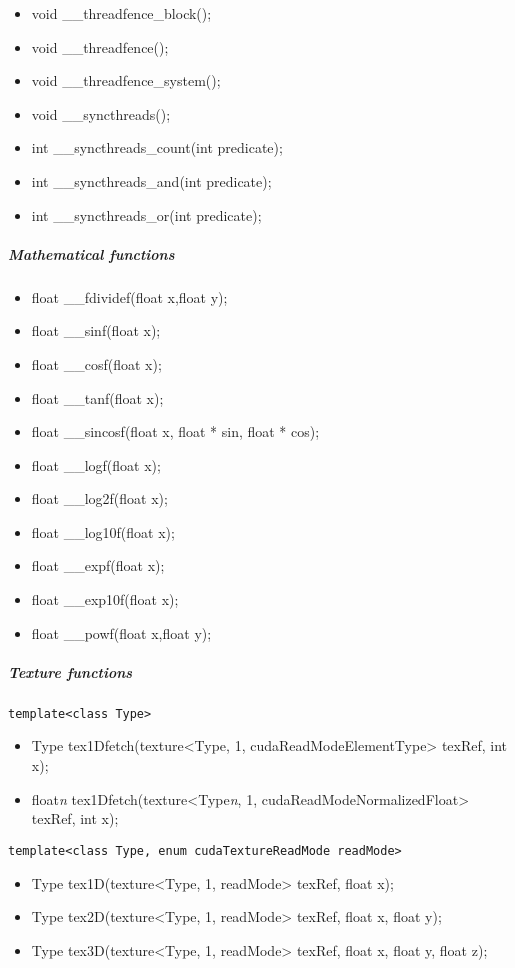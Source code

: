 \begin{itemize}
	\item void \_\_threadfence\_block();
	\item void \_\_threadfence();
	\item void \_\_threadfence\_system();
	\item void \_\_syncthreads();
	\item int \_\_syncthreads\_count(int predicate);
	\item int \_\_syncthreads\_and(int predicate);
	\item int \_\_syncthreads\_or(int predicate);
\end{itemize}

					\subparagraph{Mathematical functions}
					
\begin{itemize}
	\item float \_\_fdividef(float x,float y);
	\item float \_\_sinf(float x);
	\item float \_\_cosf(float x);
	\item float \_\_tanf(float x);
	\item float \_\_sincosf(float x, float * sin, float * cos);
	\item float \_\_logf(float x);
	\item float \_\_log2f(float x);
	\item float \_\_log10f(float x);
	\item float \_\_expf(float x);
	\item float \_\_exp10f(float x);
	\item float \_\_powf(float x,float y);
\end{itemize}

					\subparagraph{Texture functions}
					
\begin{verbatim}template<class Type>\end{verbatim}
\begin{itemize}
	\item Type tex1Dfetch(texture<Type, 1, cudaReadModeElementType> texRef, int x);
	\item float\emph{n} tex1Dfetch(texture<Type\emph{n}, 1, cudaReadModeNormalizedFloat> texRef, int x);
\end{itemize}

\begin{verbatim}template<class Type, enum cudaTextureReadMode readMode>\end{verbatim}
\begin{itemize}
	\item Type tex1D(texture<Type, 1, readMode> texRef, float x);
	\item Type tex2D(texture<Type, 1, readMode> texRef, float x, float y);
	\item Type tex3D(texture<Type, 1, readMode> texRef, float x, float y, float z);
\end{itemize}

